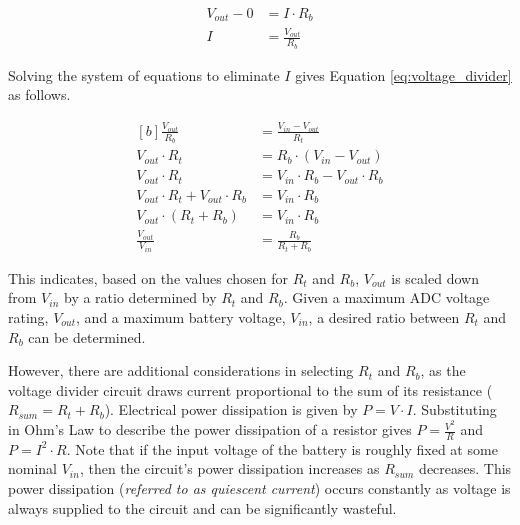 \documentclass[main.tex]{subfiles}
\begin{document}
\begin{equation}
    \begin{aligned}
        V_{out} - 0 &= I \cdot R_b \\
        I &= \frac{V_{out}}{R_b}
    \end{aligned}
    \label{eq:ohms_law_bot}
\end{equation}

\noindent Solving the system of equations to eliminate $I$ gives Equation \eqref{eq:voltage_divider} as follows. 

\begin{equation}
    \begin{aligned}[b]
        \frac{V_{out}}{R_b} &= \frac{V_{in} - V_{out}}{R_t} \\
        V_{out} \cdot R_t &= R_b \cdot (V_{in} - V_{out}) \\
        V_{out} \cdot R_t &= V_{in} \cdot R_b - V_{out} \cdot R_b \\
        V_{out} \cdot R_t + V_{out} \cdot R_b &= V_{in} \cdot R_b \\
        V_{out} \cdot (R_t + R_b) &= V_{in} \cdot R_b \\
        \frac{V_{out}}{V_{in}} &= \frac{R_b}{R_t + R_b}
    \end{aligned}
    \label{eq:voltage_divider}
\end{equation}

\noindent This indicates, based on the values chosen for $R_t$ and $R_b$, $V_{out}$ is scaled down from $V_{in}$ by a ratio determined by $R_t$ and $R_b$. Given a maximum ADC voltage rating, $V_{out}$, and a maximum battery voltage, $V_{in}$, a desired ratio between $R_t$ and $R_b$ can be determined. \newline

\newnoindentpara However, there are additional considerations in selecting $R_t$ and $R_b$, as the voltage divider circuit draws current proportional to the sum of its resistance ($R_{sum} = R_{t} + R_{b}$). Electrical power dissipation is given by $P = V \cdot I$. Substituting in Ohm's Law to describe the power dissipation of a resistor gives $P = \frac{V^2}{R}$ and $P = I^{2} \cdot R$. Note that if the input voltage of the battery is roughly fixed at some nominal $V_{in}$, then the circuit's power dissipation increases as $R_{sum}$ decreases. This power dissipation (\textit{referred to as quiescent current}) occurs constantly as voltage is always supplied to the circuit and can be significantly wasteful. \newline
\end{document}
